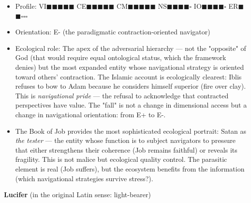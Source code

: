\begin{itemize}[nosep,leftmargin=*]
  \item Profile: VI$\blacksquare$$\blacksquare$$\blacksquare$$\blacksquare$$\blacksquare$ CE$\blacksquare$$\blacksquare$$\blacksquare$$\blacksquare$$\blacksquare$ CM$\blacksquare$$\blacksquare$$\blacksquare$$\blacksquare$$\blacksquare$ NS$\blacksquare$$\blacksquare$$\blacksquare$$\blacksquare$$\square$ IO$\blacksquare$$\blacksquare$$\blacksquare$$\blacksquare$$\square$ ER$\blacksquare$$\blacksquare$$\square$$\square$$\square$
  \item Orientation: E- (the paradigmatic contraction-oriented navigator)
  \item Ecological role: The apex of the adversarial hierarchy — not the "opposite" of God (that would require equal ontological status, which the framework denies) but the most expanded entity whose navigational strategy is oriented toward others' contraction. The Islamic account is ecologically clearest: Iblis refuses to bow to Adam because he considers himself superior (fire over clay). This is \textit{navigational pride} — the refusal to acknowledge that contracted perspectives have value. The "fall" is not a change in dimensional access but a change in navigational orientation: from E+ to E-.
  \item The Book of Job provides the most sophisticated ecological portrait: Satan as \textit{the tester} — the entity whose function is to subject navigators to pressure that either strengthens their coherence (Job remains faithful) or reveals its fragility. This is not malice but ecological quality control. The parasitic element is real (Job suffers), but the ecosystem benefits from the information (which navigational strategies survive stress?).
\end{itemize}


\textbf{Lucifer} (in the original Latin sense: light-bearer)

